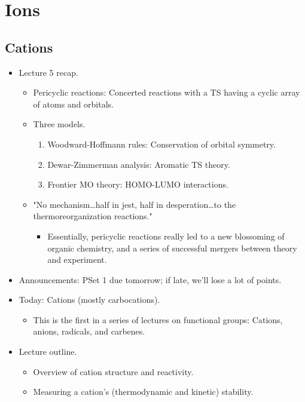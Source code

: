 \documentclass[../notes.tex]{subfiles}
\begin{document}
\chapter{Ions}
\section{Cations}
\begin{itemize}
    \item {}Lecture 5 recap.
    \begin{itemize}
        \item Pericyclic reactions: Concerted reactions with a TS having a cyclic array of atoms and orbitals.
        \item Three models.
        \begin{enumerate}
            \item Woodward-Hoffmann rules: Conservation of orbital symmetry.
            \item Dewar-Zimmerman analysis: Aromatic TS theory.
            \item Frontier MO theory: HOMO-LUMO interactions.
        \end{enumerate}
        \item "No mechanism\dots half in jest, half in desperation\dots to the thermoreorganization reactions."
        \begin{itemize}
            \item Essentially, pericyclic reactions really led to a new blossoming of organic chemistry, and a series of successful mergers between theory and experiment.
        \end{itemize}
    \end{itemize}
    \item Announcements: PSet 1 due tomorrow; if late, we'll lose a lot of points.
    \item Today: Cations (mostly carbocations).
    \begin{itemize}
        \item This is the first in a series of lectures on functional groups: Cations, anions, radicals, and carbenes.
    \end{itemize}
    \item Lecture outline.
    \begin{itemize}
        \item Overview of cation structure and reactivity.
        \item Measuring a cation's (thermodynamic and kinetic) stability.

\end{itemize}
\end{itemize}
\end{document}
